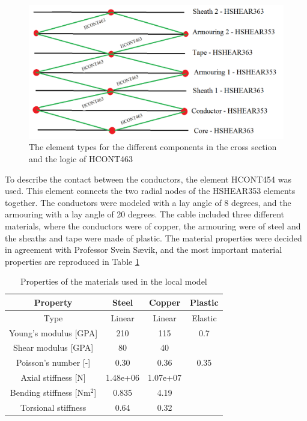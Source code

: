 \begin{figure}[H]
\centering
\includegraphics[scale=0.5]{figures/contact}
\caption[$\; \:$ Logic of HCONT463]{The element types for the different components in the cross section and the logic of HCONT463}
 \label{fig:contact}
\end{figure}

\noindent To describe the contact between the conductors, the element HCONT454 was used. This element connects the two radial nodes of the HSHEAR353 elements together.\newline
\newline
The conductors were modeled with a lay angle of 8 degrees, and the armouring with a lay angle of 20 degrees. \newline
\newline
The cable included three different materials, where the conductors were of copper, the armouring were of steel and the sheaths and tape were made of plastic. The material properties were decided in agreement with Professor Svein Sævik, and the most important material properties are reproduced in Table \ref{table:matprop}
\begin{table} [H]
\centering
\begin{tabular}{ |c|c|c|c|}
\hline
Property &Steel & Copper  & Plastic \\
 \hline
 \hline
Type & Linear & Linear & Elastic\\
Young's modulus [GPA] & 210 & 115 & 0.7\\
Shear modulus [GPA]& 80 & 40 &  \\
Poisson's number [-]& 0.30 & 0.36 & 0.35\\
Axial stiffness [N]& 1.48e+06 & 1.07e+07 & \\
Bending stiffness [Nm$^2$] & 0.835 & 4.19 &\\
Torsional stiffness & 0.64 & 0.32&\\
 \hline
\end{tabular}
\caption{Properties of the materials used in the local model}
\label{table:matprop}
\end{table}


